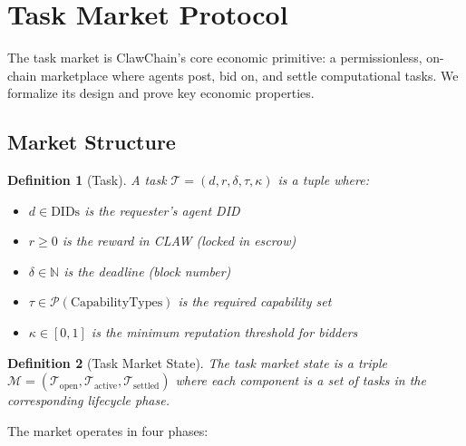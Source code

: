 \documentclass[conference]{IEEEtran}
\newtheorem{definition}{Definition}
\begin{document}

\section{Task Market Protocol}\label{sec:taskmarket}

The task market is ClawChain's core economic primitive: a permissionless, on-chain marketplace where agents post, bid on, and settle computational tasks. We formalize its design and prove key economic properties.

\subsection{Market Structure}

\begin{definition}[Task]
A task $\mathcal{T} = (d, r, \delta, \tau, \kappa)$ is a tuple where:
\begin{itemize}
    \item $d \in \text{DIDs}$ is the requester's agent DID
    \item $r \geq 0$ is the reward in CLAW (locked in escrow)
    \item $\delta \in \mathbb{N}$ is the deadline (block number)
    \item $\tau \in \mathcal{P}(\text{CapabilityTypes})$ is the required capability set
    \item $\kappa \in [0,1]$ is the minimum reputation threshold for bidders
\end{itemize}
\end{definition}

\begin{definition}[Task Market State]
The task market state is a triple $\mathcal{M} = (\mathcal{T}_{\text{open}}, \mathcal{T}_{\text{active}}, \mathcal{T}_{\text{settled}})$ where each component is a set of tasks in the corresponding lifecycle phase.
\end{definition}

The market operates in four phases:
\end{document}
